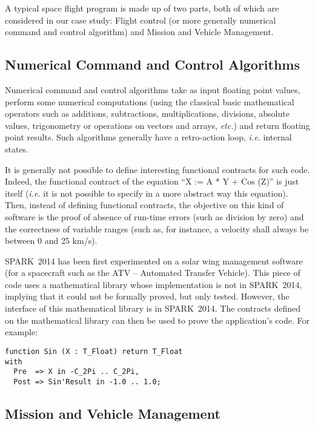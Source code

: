 \documentclass[10pt,a4paper,twocolumn]{article}
\newcommand{\newspark}{SPARK~2014\xspace}
\newcommand{\etc}{\textit{etc.}\xspace}
\newcommand{\ie}{\textit{i.e.}\xspace}
\begin{document}
A typical space flight program is made up of two parts, both of which
are considered in our case study: Flight control (or more generally
numerical command and control algorithm) and Mission and Vehicle
Management.

\subsection{Numerical Command and Control Algorithms}

Numerical command and control algorithms take as input floating point
values, perform some numerical computations (using the classical basic
mathematical operators such as additions, subtractions,
multiplications, divisions, absolute values, trigonometry or
operations on vectors and arrays, \etc) and return floating point
results. Such algorithms generally have a retro-action loop, \ie
internal states.

It is generally not possible to define interesting functional
contracts for such code. Indeed, the functional contract of the
equation ``X := A * Y + Cos (Z)'' is just itself (\ie it is not
possible to specify in a more abstract way this equation). Then,
instead of defining functional contracts, the objective on this kind
of software is the proof of absence of run-time errors (such as
division by zero) and the correctness of variable ranges (such as, for
instance, a velocity shall always be between 0 and 25 km/s).

\newspark has been first experimented on a solar wing management
software (for a spacecraft such as the ATV -- Automated Transfer
Vehicle). This piece of code uses a mathematical library whose
implementation is not in \newspark, implying that it could not be
formally proved, but only tested. However, the interface of this
mathematical library is in \newspark. The contracts defined on the
mathematical library can then be used to prove the application's
code. For example:

\begin{lstlisting}
function Sin (X : T_Float) return T_Float
with
  Pre  => X in -C_2Pi .. C_2Pi,
  Post => Sin'Result in -1.0 .. 1.0;
\end{lstlisting}

\subsection{Mission and Vehicle Management}
\end{document}
